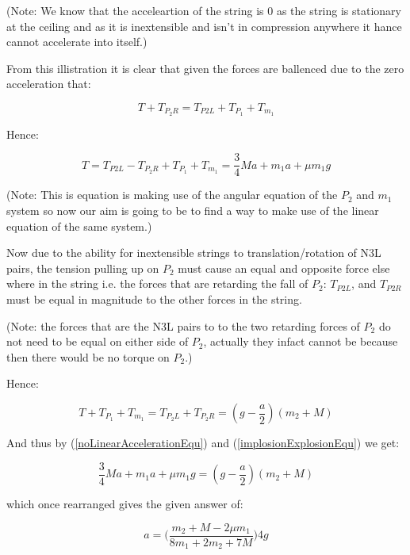 \documentclass[12pt]{article}
\begin{document}
    (Note: We know that the acceleartion of the string is \(0\) as the string is stationary at the ceiling and as it is inextensible and isn't in compression anywhere it hance cannot accelerate into itself.)

    \vspace{12pt}

    From this illistration it is clear that given the forces are ballenced due to the zero acceleration that:

    \[T+T_{P_2R}=T_{P2L}+T_{P_1}+T_{m_1}\]

    Hence:
    
    \begin{equation}
        \label{noLinearAccelerationEqu}
        T=T_{P2L}-T_{P_2R}+T_{P_1}+T_{m_1}=\frac{3}{4}Ma+m_1a+\mu m_1 g
    \end{equation}

    (Note: This is equation is making use of the angular equation of the \(P_2\) and \(m_1\) system so now our aim is going to be to find a way to make use of the linear equation of the same system.)
    
    \vspace{12pt}
    
    Now due to the ability for inextensible strings to translation/rotation of N3L pairs, the tension pulling up on \(P_2\) must cause an equal and opposite force else where in the string i.e. the forces that are retarding the fall of \(P_2\): \(T_{P2L}\), and \(T_{P2R}\) must be equal in magnitude to the other forces in the string.
    
    \vspace{12pt}
    
    (Note: the forces that are the N3L pairs to to the two retarding forces of \(P_2\) do not need to be equal on either side of \(P_2\), actually they infact cannot be because then there would be no torque on \(P_2\).)

    \vspace{12pt}

    Hence:

    \begin{equation}
        \label{implosionExplosionEqu}
        T+T_{P_1}+T_{m_1}=T_{P_2L}+T_{P_2R}=(g-\frac{a}{2})(m_2+M)
    \end{equation}

    And thus by (\ref{noLinearAccelerationEqu}) and (\ref{implosionExplosionEqu}) we get:

    \begin{equation*}
        \frac{3}{4}Ma+m_1a+\mu m_1 g=(g-\frac{a}{2})(m_2+M)
    \end{equation*}

    which once rearranged gives the given answer of:

    \begin{equation*}
        a=\Bigg(\frac{m_2+M-2\mu m_1}{8m_1+2m_2+7M}\Bigg)4g
    \end{equation*}    
\end{document}

